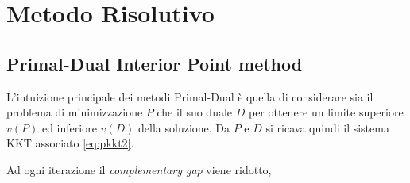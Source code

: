 \section{Metodo Risolutivo}
\subsection{Primal-Dual Interior Point method}
L'intuizione principale dei metodi Primal-Dual è 
quella di considerare sia il problema di minimizzazione
 $P$ che il suo duale $D$ per ottenere un limite 
superiore $v(P)$ ed inferiore $v(D)$ della soluzione.
Da $P$ e $D$ si ricava quindi il sistema KKT associato \ref{eq:pkkt2}.

Ad ogni iterazione il \emph{complementary gap} viene ridotto,  